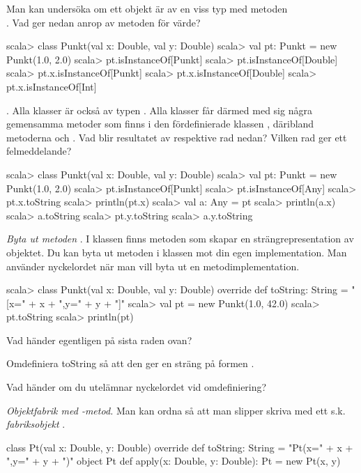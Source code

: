 \Subtask Man kan undersöka om ett objekt är av en viss typ med metoden \\ . Vad ger nedan anrop av metoden  för värde?
\begin{REPL}
scala> class Punkt(val x: Double, val y: Double)
scala> val pt: Punkt = new Punkt(1.0, 2.0)
scala> pt.isInstanceOf[Punkt]
scala> pt.isInstanceOf[Double]
scala> pt.x.isInstanceOf[Punkt]
scala> pt.x.isInstanceOf[Double]
scala> pt.x.isInstanceOf[Int]
\end{REPL}

\Task \emph{}. Alla klasser är också av typen . Alla klasser får därmed med sig några gemensamma metoder som finns i den fördefinierade klassen , däribland metoderna   och .  Vad blir resultatet av respektive rad nedan? Vilken rad ger ett felmeddelande?

\begin{REPL}
scala> class Punkt(val x: Double, val y: Double)
scala> val pt: Punkt = new Punkt(1.0, 2.0)
scala> pt.isInstanceOf[Punkt]
scala> pt.isInstanceOf[Any]
scala> pt.x.toString
scala> println(pt.x)
scala> val a: Any = pt
scala> println(a.x)
scala> a.toString
scala> pt.y.toString
scala> a.y.toString
\end{REPL}

\Task \emph{Byta ut metoden }. I klassen  finns metoden  som skapar en strängrepresentation av objektet. Du kan byta ut metoden  i klassen  mot din egen implementation. Man använder nyckelordet  när man vill byta ut en metodimplementation.

\begin{REPL}
scala> class Punkt(val x: Double, val y: Double) {
         override def toString: String = "[x=" + x + ",y=" + y + "]"
       }
scala> val pt = new Punkt(1.0, 42.0)
scala> pt.toString
scala> println(pt)
\end{REPL}

\Subtask Vad händer egentligen på sista raden ovan?

\Subtask Omdefiniera toString så att den ger en sträng på formen .

\Subtask Vad händer om du utelämnar nyckelordet  vid omdefiniering?

\Task \emph{Objektfabrik med -metod.} Man kan ordna så att man slipper skriva  med ett s.k. \emph{fabriksobjekt} . 
\begin{Code}
class Pt(val x: Double, y: Double) {
  override def toString: String = "Pt(x=" + x + ",y=" + y + ")"
}
object Pt { 
  def apply(x: Double, y: Double): Pt = new Pt(x, y)
}
\end{Code}

